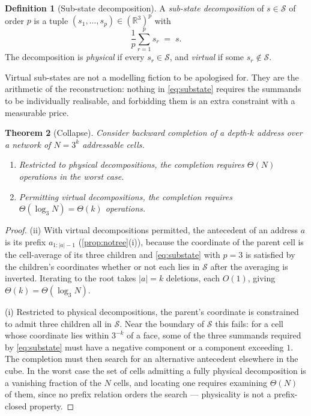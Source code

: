 \documentclass[11pt,twocolumn,a4paper]{article}
\theoremstyle{plain}
\newtheorem{theorem}{Theorem}[section]
\theoremstyle{definition}
\newtheorem{definition}[theorem]{Definition}
\theoremstyle{remark}
\newcommand{\Sspace}{\mathcal{S}}
\newcommand{\Rset}{\mathbb{R}}
\begin{document}
\begin{definition}[Sub-state decomposition]
\label{def:substate}
A \emph{sub-state decomposition} of $s \in \Sspace$ of order $p$ is a tuple
$(s_1,\dots,s_p) \in (\Rset^3)^p$ with
\begin{equation}
\frac{1}{p}\sum_{r=1}^{p} s_r \;=\; s .
\label{eq:substate}
\end{equation}
The decomposition is \emph{physical} if every $s_r \in \Sspace$, and
\emph{virtual} if some $s_r \notin \Sspace$.
\end{definition}

Virtual sub-states are not a modelling fiction to be apologised for. They are
the arithmetic of the reconstruction: nothing in \cref{eq:substate} requires the
summands to be individually realisable, and forbidding them is an extra
constraint with a measurable price.

\begin{theorem}[Collapse]
\label{thm:collapse}
Consider backward completion of a depth-$k$ address over a network of
$N = 3^{k}$ addressable cells.
\begin{enumerate}[label=(\roman*),leftmargin=2.2em]
\item Restricted to physical decompositions, the completion requires
$\Theta(N)$ operations in the worst case.
\item Permitting virtual decompositions, the completion requires
$\Theta(\log_3 N) = \Theta(k)$ operations.
\end{enumerate}
\end{theorem}

\begin{proof}
(ii) With virtual decompositions permitted, the antecedent of an address $a$ is
its prefix $a_{1:|a|-1}$ (\cref{prop:notree}(i)), because the coordinate of the
parent cell is the cell-average of its three children and \cref{eq:substate}
with $p=3$ is satisfied by the children's coordinates whether or not each lies
in $\Sspace$ after the averaging is inverted. Iterating to the root takes $|a|=k$
deletions, each $O(1)$, giving $\Theta(k) = \Theta(\log_3 N)$.

(i) Restricted to physical decompositions, the parent's coordinate is
constrained to admit three children all in $\Sspace$. Near the boundary of
$\Sspace$ this fails: for a cell whose coordinate lies within $3^{-k}$ of a face,
some of the three summands required by \cref{eq:substate} must have a negative
component or a component exceeding $1$. The completion must then search for an
alternative antecedent elsewhere in the cube. In the worst case the set of cells
admitting a fully physical decomposition is a vanishing fraction of the
$N$ cells, and locating one requires examining $\Theta(N)$ of them, since no
prefix relation orders the search --- physicality is not a prefix-closed
property.
\end{proof}
\end{document}
